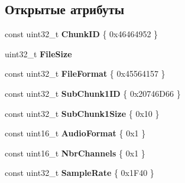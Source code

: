 \subsection*{Открытые атрибуты}
\begin{DoxyCompactItemize}
\item 
\mbox{\label{struct_w_a_v_e___format_type_def_a9e56c5528ba5f964ea9a6dbd4d0e1682}} 
const uint32\+\_\+t {\bfseries Chunk\+ID} \{ 0x46464952 \}
\item 
\mbox{\label{struct_w_a_v_e___format_type_def_ada518c6be3de72904ebafd155ec9630d}} 
uint32\+\_\+t {\bfseries File\+Size}
\item 
\mbox{\label{struct_w_a_v_e___format_type_def_acad647933f0c40b1d303a397d9f67b4d}} 
const uint32\+\_\+t {\bfseries File\+Format} \{ 0x45564157 \}
\item 
\mbox{\label{struct_w_a_v_e___format_type_def_ab5180372ca4a5bcb1775f4c45343eb22}} 
const uint32\+\_\+t {\bfseries Sub\+Chunk1\+ID} \{ 0x20746\+D66 \}
\item 
\mbox{\label{struct_w_a_v_e___format_type_def_a6a53e86701dc1a4a93630ee3ad53438a}} 
const uint32\+\_\+t {\bfseries Sub\+Chunk1\+Size} \{ 0x10 \}
\item 
\mbox{\label{struct_w_a_v_e___format_type_def_afa331bc2177f7f7df7d5332b8b9d9d2c}} 
const uint16\+\_\+t {\bfseries Audio\+Format} \{ 0x1 \}
\item 
\mbox{\label{struct_w_a_v_e___format_type_def_acc7e2458d4ca37fbf4acd51475f82b10}} 
const uint16\+\_\+t {\bfseries Nbr\+Channels} \{ 0x1 \}
\item 
\mbox{\label{struct_w_a_v_e___format_type_def_a672b7e05b22d49864679d9d45367d0ad}} 
const uint32\+\_\+t {\bfseries Sample\+Rate} \{ 0x1\+F40 \}
\item 
\mbox{\label{struct_w_a_v_e___format_type_def_a8dc13a7a425fbefd6357b06cc1752234}} 

\end{DoxyCompactItemize}

